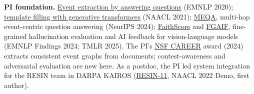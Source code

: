 \documentclass[11pt]{article}
\newcommand{\head}[1]{{\color{navy}\textbf{#1}}\enspace}
\begin{document}
\head{PI foundation.} \href{https://doi.org/10.18653/v1/2020.emnlp-main.49}{Event extraction by answering questions} (EMNLP 2020); \href{https://doi.org/10.18653/v1/2021.naacl-main.70}{template filling with generative transformers} (NAACL 2021); \href{https://proceedings.neurips.cc/paper_files/paper/2024/hash/e560a0b22e4432003d0dba63ff8dc457-Abstract.html}{MEQA}, multi-hop event-centric question answering (NeurIPS 2024); \href{https://doi.org/10.18653/v1/2024.findings-emnlp.290}{FaithScore} and \href{https://arxiv.org/abs/2404.05046}{FGAIF}, fine-grained hallucination evaluation and AI feedback for vision-language models (EMNLP Findings 2024; TMLR 2025). The PI's \href{https://www.nsf.gov/awardsearch/showAward?AWD_ID=2340435}{NSF CAREER} award (2024) extracts consistent event graphs from documents; contest-awareness and adversarial evaluation are new here. As a postdoc, the PI led system integration for the RESIN team in DARPA KAIROS (\href{https://doi.org/10.18653/v1/2022.naacl-demo.7}{\mbox{RESIN-11}}, NAACL 2022 Demo, first author).
\end{document}
